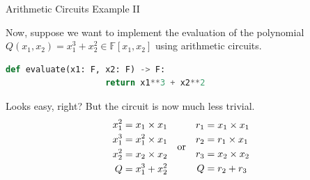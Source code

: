 \documentclass{zkdl-presentation-template}
\begin{document}
    \begin{frame}[fragile]{Arithmetic Circuits Example II}
        \begin{example}
            Now, suppose we want to implement the evaluation of the polynomial
            $Q(x_1,x_2) = x_1^3 + x_2^2 \in \mathbb{F}[x_1,x_2]$ using arithmetic circuits.
            \begin{lstlisting}[language=Python, numbers=none, autogobble=true, xleftmargin=10pt]
                def evaluate(x1: F, x2: F) -> F:
                    return x1**3 + x2**2
            \end{lstlisting}
            Looks easy, right? \pause But the circuit is now much less trivial.
            \vspace{-8pt}
            \begin{equation*}
                \begin{array}{c c c}
                    \begin{aligned}
                        x_1^2 &= x_1 \times x_1 \\
                        x_1^3 &= x_1^2 \times x_1 \\
                        x_2^2 &= x_2 \times x_2 \\
                        Q &= x_1^3 + x_2^2 
                    \end{aligned}
                    & \text{or} &
                    \begin{aligned}
                        r_1 &= x_1 \times x_1 \\
                        r_2 &= r_1 \times x_1 \\
                        r_3 &= x_2 \times x_2 \\
                        Q &= r_2 + r_3 
                    \end{aligned}
                \end{array}
            \end{equation*}
        \end{example}
    \end{frame}
\end{document}
